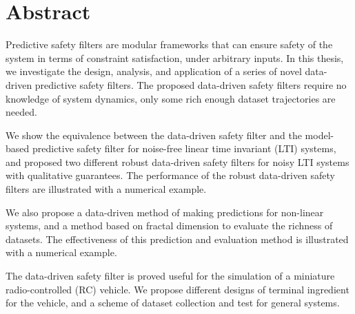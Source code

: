 




 \setcounter{tocdepth}{2}
 \tableofcontents

 \cleardoublepage


\chapter*{Abstract}

Predictive safety filters are modular frameworks that can ensure safety of the system in terms of constraint satisfaction, under arbitrary inputs.
In this thesis, we investigate the design, analysis, and application of a series of novel data-driven predictive safety filters.
The proposed data-driven safety filters require no knowledge of system dynamics, only some rich enough dataset trajectories are needed.

We show the equivalence between the data-driven safety filter and the model-based predictive safety filter for noise-free linear time invariant (LTI) systems, and proposed two different robust data-driven safety filters for noisy LTI systems with qualitative guarantees.
The performance of the robust data-driven safety filters are illustrated with a numerical example.

We also propose a data-driven method of making predictions for non-linear systems, and a method based on fractal dimension to evaluate the richness of datasets.
The effectiveness of this prediction and evaluation method is illustrated with a numerical example.

The data-driven safety filter is proved useful for the simulation of a miniature radio-controlled (RC) vehicle.
We propose different designs of terminal ingredient for the vehicle, and a scheme of dataset collection and test for general systems.

